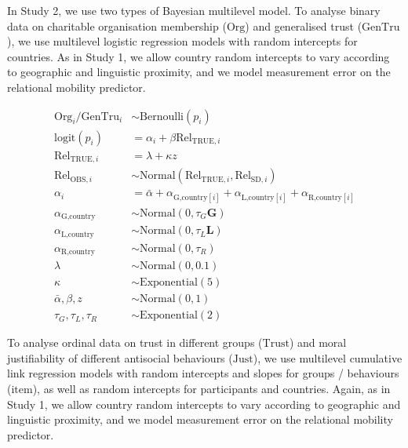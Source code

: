 \documentclass[
  man,floatsintext]{apa6}
\begin{document}
In Study 2, we use two types of Bayesian multilevel model. To analyse binary data on charitable organisation membership (\(\text{Org}\)) and generalised trust (\(\text{GenTru}\)), we use multilevel logistic regression models with random intercepts for countries. As in Study 1, we allow country random intercepts to vary according to geographic and linguistic proximity, and we model measurement error on the relational mobility predictor.

\[
\begin{aligned}
\text{Org}_{i}/\text{GenTru}_{i} &\sim \text{Bernoulli}(p_{i}) \\
\text{logit}(p_{i}) &= \alpha_{i} + \beta\text{Rel}_{\text{TRUE},i} \\
\text{Rel}_{\text{TRUE},i} &= \lambda + \kappa z \\
\text{Rel}_{\text{OBS},i} &\sim \text{Normal}(\text{Rel}_{\text{TRUE},i}, \text{Rel}_{\text{SD},i}) \\
\alpha_{i} &= \bar{\alpha} + \alpha_{\text{G,country}[i]} + \alpha_{\text{L,country}[i]} + \alpha_{\text{R,country}[i]} \\
\alpha_{\text{G,country}} &\sim \text{Normal}(0, \tau_{G} \textbf{G}) \\
\alpha_{\text{L,country}} &\sim \text{Normal}(0, \tau_{L} \textbf{L}) \\
\alpha_{\text{R,country}} &\sim \text{Normal}(0, \tau_{R}) \\
\lambda &\sim \text{Normal}(0, 0.1) \\
\kappa &\sim \text{Exponential}(5) \\
\bar{\alpha},\beta,z &\sim \text{Normal}(0, 1)\\
\tau_{G},\tau_{L},\tau_{R} &\sim \text{Exponential}(2)
\end{aligned}
\]

To analyse ordinal data on trust in different groups (\(\text{Trust}\)) and moral justifiability of different antisocial behaviours (\(\text{Just}\)), we use multilevel cumulative link regression models with random intercepts and slopes for groups / behaviours (\(\text{item}\)), as well as random intercepts for participants and countries. Again, as in Study 1, we allow country random intercepts to vary according to geographic and linguistic proximity, and we model measurement error on the relational mobility predictor.
\end{document}
